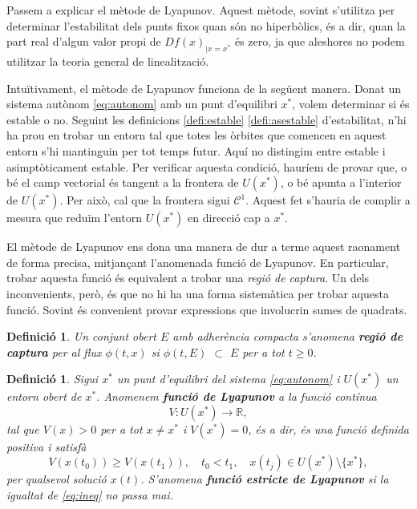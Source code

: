 \documentclass[11pt,a4paper,openright,oneside]{article}
\numberwithin{equation}{section}
\newtheorem{defi}[teo]{Definici\'o}
\theoremstyle{definition}
\begin{document}
Passem a explicar el mètode de Lyapunov. Aquest mètode, sovint s'utilitza per determinar l'estabilitat dels punts fixos quan són no hiperbòlics, és a dir, quan la part real d'algun valor propi de $Df(x)_{\lvert x=x^{*}}$ és zero, ja que aleshores no podem utilitzar la teoria general de linealització.

Intuïtivament, el mètode de Lyapunov funciona de la següent manera. Donat un sistema autònom \eqref{eq:autonom} amb un punt d'equilibri $x^{*}$, volem determinar si és estable o no. Seguint les definicions \eqref{defi:estable} \eqref{defi:asestable} d'estabilitat, n'hi ha prou en trobar un entorn tal que totes les òrbites que comencen en aquest entorn s'hi mantinguin per tot temps futur. Aquí no distingim entre estable i asimptòticament estable. Per verificar aquesta condició, hauríem de provar que, o bé el camp vectorial és tangent a la frontera de $U\left(x^{*}\right)$, o bé apunta a l'interior de $U\left(x^{*}\right)$. Per això, cal que la frontera sigui $\mathcal{C}^{1}$. Aquest fet s'hauria de complir a mesura que reduïm l'entorn $U\left(x^{*}\right)$ en direcció cap a $x^{*}$.

El mètode de Lyapunov ens dona una manera de dur a terme aquest raonament de forma precisa, mitjançant l'anomenada funció de Lyapunov. En particular, trobar aquesta funció és equivalent a trobar una \textit{regió de captura}. Un dels inconvenients, però, és que no hi ha una forma sistemàtica per trobar aquesta funció. Sovint és convenient provar expressions que involucrin sumes de quadrats.

\begin{defi} \label{defi:captura}
    Un conjunt obert $E$ amb adherència compacta s'anomena \textbf{regió de captura} per al flux $\phi(t, x)$ si $\phi\left(t,E\right)$ $\subset$ $E$ per a tot $t\geq0$.
\end{defi}

\begin{defi} \label{defi:lyapunov}
    Sigui $x^{*}$ un punt d'equilibri del sistema \eqref{eq:autonom} i $U\left(x^{*}\right)$ un entorn obert de $x^{*}$. Anomenem \textbf{funció de Lyapunov} a la funció contínua \begin{equation*}
        V:U\left(x^{*}\right)\rightarrow{\mathbb{R}},
    \end{equation*}
    tal que $V\left(x\right)>0$ per a tot $x\neq x^{*}$ i $V\left(x^{*}\right)=0$, és a dir, és una funció definida positiva i satisfà \begin{equation} \label{eq:ineq}
        V\left(x\left(t_0\right)\right)\geq V\left(x\left(t_1\right)\right), \quad t_0<t_1, \quad x\left(t_j\right)\in U\left(x^{*}\right)\setminus \{x^{*}\},
    \end{equation}
    per qualsevol solució $x(t)$. S'anomena \textbf{funció estricte de Lyapunov} si la igualtat de \eqref{eq:ineq} no passa mai.
\end{defi}
\end{document}
